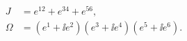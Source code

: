 \begin{equation}
\label{JOform}
\begin{aligned}
   J &= e^{12} + e^{34} + e^{56} , \\
   \Omega &= (e^1+\ii e^2)(e^3+\ii e^4)(e^5+\ii e^6) . 
\end{aligned}
\end{equation}

